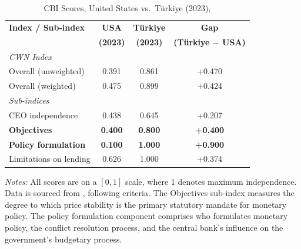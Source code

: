 \documentclass[12pt,a4paper]{article}
\begin{document}
\begin{doublespace}
\begin{singlespace}
\begin{table}[H]
\centering
\caption{CBI Scores, United States vs.\ T\"urkiye (2023), \textcite{garriga_revisiting_2025}}
\label{tab:garriga_us_cbi}
\begin{tabular}{lccc}
\toprule
\textbf{Index / Sub-index} & \textbf{USA} & \textbf{T\"urkiye} & \textbf{Gap} \\
 & \textbf{(2023)} & \textbf{(2023)} & \textbf{(T\"urkiye $-$ USA)} \\
\midrule
\multicolumn{4}{l}{\textit{CWN Index}} \\
\quad Overall (unweighted) & 0.391 & 0.861 & +0.470 \\
\quad Overall (weighted)   & 0.475 & 0.899 & +0.424 \\
\midrule
\multicolumn{4}{l}{\textit{Sub-indices}} \\
\quad CEO independence        & 0.438 & 0.645 & +0.207 \\
\quad \textbf{Objectives}    & \textbf{0.400} & \textbf{0.800} & \textbf{+0.400} \\
\quad \textbf{Policy formulation} & \textbf{0.100} & \textbf{1.000} & \textbf{+0.900} \\
\quad Limitations on lending & 0.626 & 1.000 & +0.374 \\
\bottomrule
\end{tabular}
\smallskip
\begin{minipage}{\linewidth}
\footnotesize\textit{Notes:} All scores are on a $[0,1]$ scale, where 1 denotes maximum independence. Data is sourced from \textcite{garriga_revisiting_2025}, following \textcite{cukierman_measuring_1992} criteria. The Objectives sub-index measures the degree to which price stability is the primary statutory mandate for monetary policy. The policy formulation component comprises who formulates monetary policy, the conflict resolution process, and the central bank's influence on the government's budgetary process.
\end{minipage}
\end{table}
\end{singlespace}



\end{doublespace}
\end{document}
